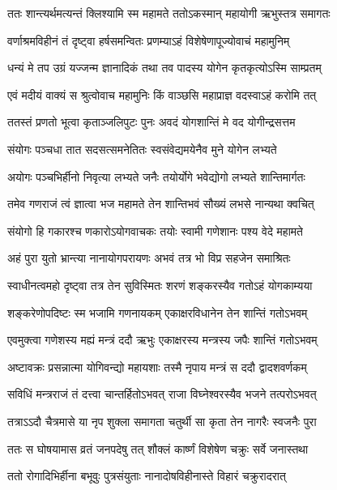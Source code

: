 \twolineshloka
{ततः शान्त्यर्थमत्यन्तं क्लिश्यामि स्म महामते}
{ततोऽकस्मान् महायोगी ऋभुस्तत्र समागतः} %

\twolineshloka
{वर्णाश्रमविहीनं तं दृष्ट्वा हर्षसमन्वितः}
{प्रणम्याऽहं विशेषेणापूज्योवाचं महामुनिम्} %

\twolineshloka
{धन्यं मे तप उग्रं यज्जन्म ज्ञानादिकं तथा}
{तव पादस्य योगेन कृतकृत्योऽस्मि साम्प्रतम्} %

\twolineshloka
{एवं मदीयं वाक्यं स श्रुत्वोवाच महामुनिः}
{किं वाञ्छसि महाप्राज्ञ वदस्वाऽहं करोमि तत्} %

\twolineshloka
{ततस्तं प्रणतो भूत्वा कृताञ्जलिपुटः पुनः}
{अवदं योगशान्तिं मे वद योगीन्द्रसत्तम} %


\twolineshloka
{संयोगः पञ्चधा तात सदसत्समनेतितः}
{स्वसंवेद्यमयेनैव मुने योगेन लभ्यते} %

\twolineshloka
{अयोगः पञ्चभिर्हीनो निवृत्या लभ्यते जनैः}
{तयोर्योगे भवेद्योगो लभ्यते शान्तिमार्गतः} %

\twolineshloka
{तमेव गणराजं त्वं ज्ञात्वा भज महामते}
{तेन शान्तिभवं सौख्यं लभसे नान्यथा क्वचित्} %

\twolineshloka
{संयोगो हि गकारश्च णकारोऽयोगवाचकः}
{तयोः स्वामी गणेशानः पश्य वेदे महामते} %

\twolineshloka
{अहं पुरा युतो भ्रान्त्या नानायोगपरायणः}
{अभवं तत्र भो विप्र सहजेन समाश्रितः} %

\twolineshloka
{स्वाधीनत्वमहो दृष्ट्वा तत्र तेन सुविस्मितः}
{शरणं शङ्करस्यैव गतोऽहं योगकाम्यया} %

\twolineshloka
{शङ्करेणोपदिष्टः स्म भजामि गणनायकम्}
{एकाक्षरविधानेन तेन शान्तिं गतोऽभवम्} %

\twolineshloka
{एवमुक्त्वा गणेशस्य मह्यं मन्त्रं ददौ ऋभुः}
{एकाक्षरस्य मन्त्रस्य जपैः शान्तिं गतोऽभवम्} %

\twolineshloka
{अष्टावक्रः प्रसन्नात्मा योगिवन्द्यो महायशाः}
{तस्मै नृपाय मन्त्रं स ददौ द्वादशवर्णकम्} %

\twolineshloka
{सविधिं मन्त्रराजं तं दत्त्वा चान्तर्हितोऽभवत्}
{राजा विघ्नेश्वरस्यैव भजने तत्परोऽभवत्} %

\twolineshloka
{तत्राऽऽदौ चैत्रमासे या नृप शुक्ला समागता}
{चतुर्थी सा कृता तेन नागरैः स्वजनैः पुरा} %

\twolineshloka
{ततः स घोषयामास व्रतं जनपदेषु तत्}
{शौक्लं कार्ष्णं विशेषेण चक्रुः सर्वे जनास्तथा} %

\twolineshloka
{ततो रोगादिभिर्हीना बभूवुः पुत्रसंयुताः}
{नानादोषविहीनास्ते विहारं चक्रुरादरात्} %

